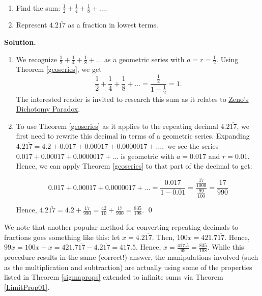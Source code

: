 \documentclass{ximera}
\begin{document}
\begin{example} \label{geoseriesex} $~$

\begin{enumerate}

\item  Find the sum: $\frac{1}{2} + \frac{1}{4}  + \frac{1}{8} + \ldots$.  

\item Represent $4.2\overline{17}$ as a fraction in lowest terms. 

\end{enumerate}

{\bf Solution.}

\begin{enumerate}

\item  We recognize $\frac{1}{2} + \frac{1}{4}  + \frac{1}{8} + \ldots$ as a geometric series with $a = r = \frac{1}{2}$.  Using Theorem \ref{geoseries}, we get \[\frac{1}{2} + \frac{1}{4}  + \frac{1}{8} + \ldots = \frac{\frac{1}{2}}{1 - \frac{1}{2}} = 1.\]  The interested reader is invited to research this sum as it relates to  \href{https://en.wikipedia.org/wiki/Zeno's_paradoxes}{\underline{Zeno's Dichotomy Paradox}}.

\item  To use  Theorem \ref{geoseries} as it applies to the repeating decimal $4.2\overline{17}$, we first need to rewrite this decimal in terms of a geometric series.  Expanding  $4.2\overline{17} = 4.2 + 0.017 + 0.00017 + 0.0000017 + \ldots,$ we see the series $0.017 + 0.00017 + 0.0000017 + \ldots$ is geometric with $a = 0.017$ and $r = 0.01$.  Hence, we can apply Theorem \ref{geoseries} to that part of the decimal to get:

\[ 0.017 + 0.00017 + 0.0000017 + \ldots = \frac{0.017}{1 - 0.01} = \frac{\frac{17}{1000}}{\frac{99}{100}} = \frac{17}{990} \]

Hence, $4.2\overline{17} = 4.2 + \frac{17}{990} = \frac{42}{10} + \frac{17}{990} = \frac{835}{198}$. \qed

\end{enumerate}

\end{example}

We note that another popular method for converting repeating decimals to fractions goes something like this:  let $x =4.2\overline{17}$. Then, $100x = 421.7\overline{17}$.  Hence, $99x = 100x - x = 421.7\overline{17} - 4.2\overline{17} = 417.5$.  Hence,  $x = \frac{417.5}{99}  = \frac{835}{198}$.  While this procedure results in the same (correct!) answer, the manipulations involved (such as the multiplication and subtraction) are actually using some of the properties listed in Theorem \ref{sigmaprops}  extended to infinite sums via Theorem \ref{LimitProp01}.
\end{document}
